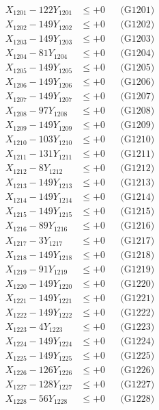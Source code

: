 \documentclass[a4paper,10pt]{article}
\begin{document}
{\begin{align}
\allowbreak
X_{1201} - 122Y_{1201} &\leq +0 && \text{(G1201)} \\
X_{1202} - 149Y_{1202} &\leq +0 && \text{(G1202)} \\
X_{1203} - 149Y_{1203} &\leq +0 && \text{(G1203)} \\
X_{1204} - 81Y_{1204} &\leq +0 && \text{(G1204)} \\
X_{1205} - 149Y_{1205} &\leq +0 && \text{(G1205)} \\
X_{1206} - 149Y_{1206} &\leq +0 && \text{(G1206)} \\
X_{1207} - 149Y_{1207} &\leq +0 && \text{(G1207)} \\
X_{1208} - 97Y_{1208} &\leq +0 && \text{(G1208)} \\
X_{1209} - 149Y_{1209} &\leq +0 && \text{(G1209)} \\
X_{1210} - 103Y_{1210} &\leq +0 && \text{(G1210)} \\
\allowbreak
X_{1211} - 131Y_{1211} &\leq +0 && \text{(G1211)} \\
X_{1212} - 8Y_{1212} &\leq +0 && \text{(G1212)} \\
X_{1213} - 149Y_{1213} &\leq +0 && \text{(G1213)} \\
X_{1214} - 149Y_{1214} &\leq +0 && \text{(G1214)} \\
X_{1215} - 149Y_{1215} &\leq +0 && \text{(G1215)} \\
X_{1216} - 89Y_{1216} &\leq +0 && \text{(G1216)} \\
X_{1217} - 3Y_{1217} &\leq +0 && \text{(G1217)} \\
X_{1218} - 149Y_{1218} &\leq +0 && \text{(G1218)} \\
X_{1219} - 91Y_{1219} &\leq +0 && \text{(G1219)} \\
X_{1220} - 149Y_{1220} &\leq +0 && \text{(G1220)} \\
\allowbreak
X_{1221} - 149Y_{1221} &\leq +0 && \text{(G1221)} \\
X_{1222} - 149Y_{1222} &\leq +0 && \text{(G1222)} \\
X_{1223} - 4Y_{1223} &\leq +0 && \text{(G1223)} \\
X_{1224} - 149Y_{1224} &\leq +0 && \text{(G1224)} \\
X_{1225} - 149Y_{1225} &\leq +0 && \text{(G1225)} \\
X_{1226} - 126Y_{1226} &\leq +0 && \text{(G1226)} \\
X_{1227} - 128Y_{1227} &\leq +0 && \text{(G1227)} \\
X_{1228} - 56Y_{1228} &\leq +0 && \text{(G1228)} \\

\end{align}}
\end{document}
